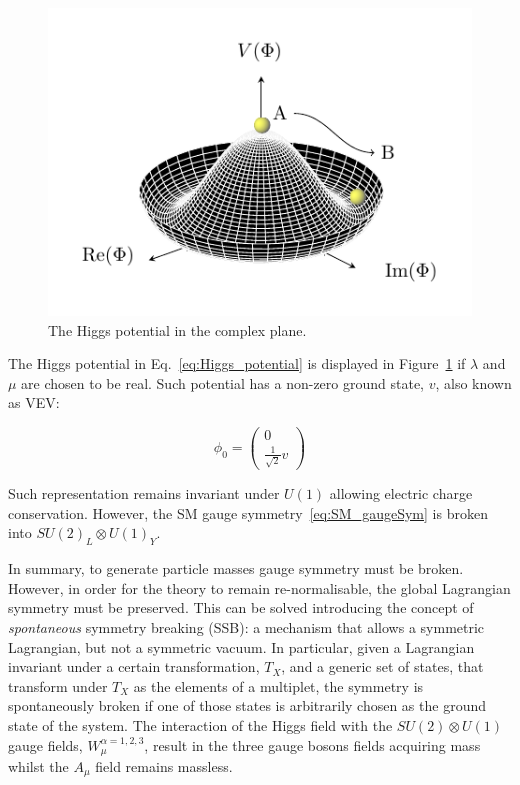 			\begin{figure}
				\centering
				\includegraphics[width=.4\textwidth]{HiggsPotential/HiggsPotential}
				\caption{\label{fig:higgs_potential}The Higgs potential in the complex plane.} %
			\end{figure}

			The Higgs potential in Eq.~\ref{eq:Higgs_potential} is displayed in Figure~\ref{fig:higgs_potential} if $\lambda$ and $\mu$ are chosen to be real. Such potential has a non-zero ground state, $v$, also known as \ac{VEV}:

			\begin{equation}
			\label{eq:Higgs_vev}
				\phi_0 = 
				\begin{pmatrix}
					0 \\ \frac{1}{\sqrt{2}} v
				\end{pmatrix}
			\end{equation}

			\noindent Such representation remains invariant under $U(1)$ allowing electric charge conservation. However, the \ac{SM} gauge symmetry~\ref{eq:SM_gaugeSym} is broken into $SU(2)_L \otimes U(1)_Y$.

			In summary, to generate particle masses gauge symmetry must be broken. However, in order for the theory to remain re-normalisable, the global Lagrangian symmetry must be preserved. This can be solved introducing the concept of \emph{spontaneous} symmetry breaking (SSB): a mechanism that allows a symmetric Lagrangian, but not a symmetric vacuum. In particular, given a Lagrangian invariant under a certain transformation, $T_X$, and a generic set of states, that transform under $T_X$ as the elements of a multiplet, the symmetry is spontaneously broken if one of those states is arbitrarily chosen as the ground state of the system. 
			The interaction of the Higgs field with the $SU(2) \otimes U(1)$ gauge fields, $W_\mu^{\alpha =1,2,3}$, result in the three gauge bosons fields acquiring mass whilst the $A_\mu$ field remains massless. 



